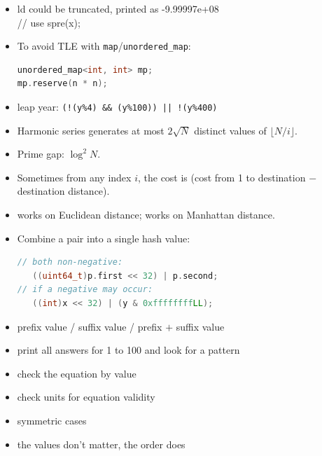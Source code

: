 
\begin{itemize}
\item ld could be truncated, printed as -9.99997e+08 \\// use spre(x);
\item To avoid TLE with \texttt{map}/\texttt{unordered\_map}:
\begin{lstlisting}[language=C++]
unordered_map<int, int> mp;
mp.reserve(n * n);
\end{lstlisting}
\end{itemize}

\begin{itemize}
\item leap year: \texttt{(!(y\%4) \&\& (y\%100)) || !(y\%400)}
\item Harmonic series generates at most $2\sqrt{N}$ distinct values of $\lfloor N/i \rfloor$.
\item Prime gap: $\log^2 N$.
\item Sometimes from any index $i$, the cost is (cost from 1 to destination $-$ destination distance).
\item {} works on Euclidean distance;  works on Manhattan distance.
\item Combine a pair into a single hash value:
\begin{lstlisting}[language=C++]
// both non-negative:
   ((uint64_t)p.first << 32) | p.second;
// if a negative may occur:
   ((int)x << 32) | (y & 0xffffffffLL);
\end{lstlisting}
\end{itemize}

\begin{itemize}
\item prefix value / suffix value / prefix $+$ suffix value
\item print all answers for 1 to 100 and look for a pattern
\item check the equation by value
\item check units for equation validity
\item symmetric cases
\item the values don't matter, the order does
\end{itemize}


